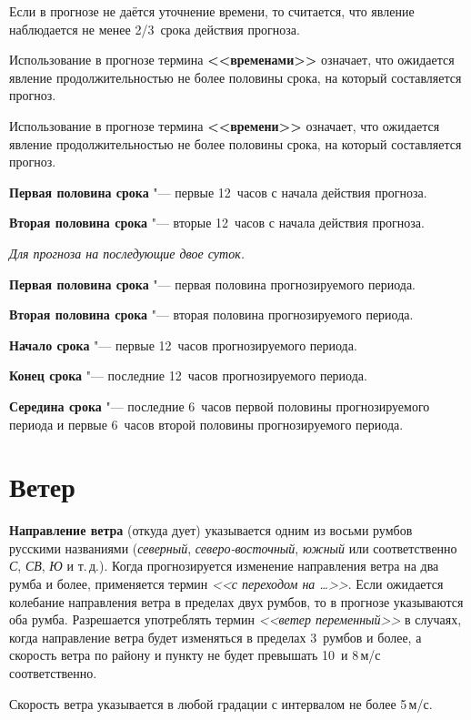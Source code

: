 \documentclass[a4paper, 12pt, twoside, draft, book, russian, fittopage, cyremdash, openright]{ncc}
\newcommand{\mps}{\,м/с\xspace}
\begin{document}
Если в прогнозе не даётся уточнение времени, то считается, что явление
наблюдается не менее 2/3~срока действия прогноза.

Использование в прогнозе термина \textbf{<<временами>>} означает, что ожидается
явление продолжительностью не более половины срока, на который
составляется прогноз.

Использование в прогнозе термина \textbf{<<времени>>} означает, что ожидается
явление продолжительностью не более половины срока, на который
составляется прогноз.

\textbf{Первая половина срока} "--- первые 12~часов с начала действия прогноза.

\textbf{Вторая половина срока} "--- вторые 12~часов с начала действия прогноза.

\textit{Для прогноза на последующие двое суток.}

\textbf{Первая половина срока} "--- первая половина прогнозируемого периода.

\textbf{Вторая половина срока} "--- вторая половина прогнозируемого периода.

\textbf{Начало срока} "--- первые 12~часов прогнозируемого периода.

\textbf{Конец срока} "--- последние 12~часов прогнозируемого периода.

\textbf{Середина срока} "--- последние 6~часов первой половины прогнозируемого
периода и первые 6~часов второй половины прогнозируемого периода.

\section{Ветер}
\label{sec:wind_p}

\textbf{Направление ветра} (откуда дует) указывается одним из восьми
румбов русскими названиями (\textit{северный}, \textit{северо-восточный}, \textit{южный} или
соответственно \textit{С}, \textit{СВ}, \textit{Ю} и т.\,д.).
Когда прогнозируется изменение
направления ветра на два румба и более, применяется термин \textit{<<с
переходом на \ldots>>}. Если ожидается колебание направления ветра в
пределах двух румбов, то в прогнозе указываются оба румба. Разрешается
употреблять термин \textit{<<ветер переменный>>} в случаях, когда направление
ветра будет изменяться в пределах 3~румбов и более, а скорость ветра
по району и пункту не будет превышать 10~и 8\mps соответственно.

Скорость ветра указывается в любой градации с интервалом не более 5\mps.
\end{document}
